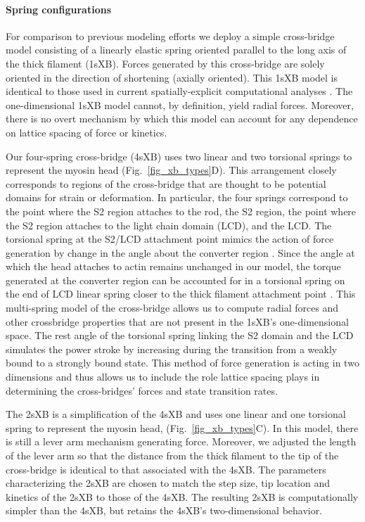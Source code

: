 \documentclass[]{article}
\begin{document}
\paragraph{Spring configurations} %
For comparison to previous modeling efforts we deploy a simple cross-bridge model consisting of a linearly elastic spring oriented parallel to the long axis of the thick filament (1sXB).  
Forces generated by this cross-bridge are solely oriented in the direction of shortening (axially oriented). 
This 1sXB model is identical to those used in current spatially-explicit computational analyses \citep{Daniel1998, Chase2004, Tanner2007}. 
The one-dimensional 1sXB model cannot, by definition, yield radial forces.  
Moreover, there is no overt mechanism by which this model can account for any dependence on lattice spacing of force or kinetics.

Our four-spring cross-bridge (4sXB) uses two linear and two torsional springs to represent the myosin head (Fig.~\ref{fig_xb_types}D).
This arrangement closely corresponds to regions of the cross-bridge that are thought to be potential domains for strain or deformation. 
In particular, the four springs correspond to the point where the S2 region attaches to the rod, the S2 region, the point where the S2 region attaches to the light chain domain (LCD), and the LCD. 
The torsional spring at the S2/LCD attachment point mimics the action of force generation by change in the angle about the converter region \citep{Houdusse2000, Houdusse2001}. %
Since the angle at which the head attaches to actin remains unchanged in our model, the torque generated at the converter region can be accounted for in a torsional spring on the end of LCD linear spring closer to the thick filament attachment point \citep{Lauzon2001}. %
This multi-spring model of the cross-bridge allows us to compute radial forces and other crossbridge properties that are not present in the 1sXB's one-dimensional space. 
The rest angle of the torsional spring linking the S2 domain and the LCD simulates the power stroke by increasing during the transition from a weakly bound to a strongly bound state.
This method of force generation is acting in two dimensions and thus allows us to include the role lattice spacing plays in determining the cross-bridges' forces and state transition rates.

The 2sXB is a simplification of the 4sXB and uses one linear and one torsional spring to represent the myosin head, (Fig.~\ref{fig_xb_types}C).
In this model, there is still a lever arm mechanism generating force.  
Moreover, we adjusted the length of the lever arm so that the distance from the thick filament to the tip of the cross-bridge is identical to that associated with the 4sXB.
The parameters characterizing the 2sXB are chosen to match the step size, tip location and kinetics of the 2sXB to those of the 4sXB. 
The resulting 2sXB is computationally simpler than the 4sXB, but retains the 4sXB's two-dimensional behavior.
\end{document}
